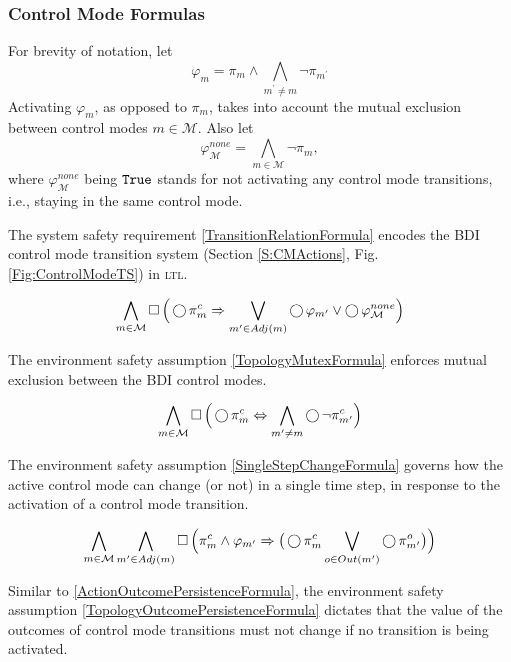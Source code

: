 
\subsubsection{Control Mode Formulas}

For brevity of notation, let $$\varphi_m = \pi_m \wedge \bigwedge_{m^\prime \neq m} \lnot \pi_{m^\prime}$$
Activating $\varphi_m$, as opposed to $\pi_m$, takes into account the mutual exclusion between control modes $m \in \mathcal{M}$.
Also let $$\varphi_\mathcal{M}^{none} = \bigwedge_{m \in \mathcal{M}} \lnot \pi_m,$$
where $\varphi_\mathcal{M}^{none}$ being $\mathtt{True}$ stands for not activating any control mode transitions, i.e., staying in the same control mode.

The system safety requirement \eqref{TransitionRelationFormula} encodes the BDI control mode transition system (Section \ref{S:CMActions}, Fig. \ref{Fig:ControlModeTS}) in \textsc{ltl}.

\begin{equation}\label{TransitionRelationFormula}
	\bigwedge \limits_{m \in \mathcal{M}} \operatorname{\Box} \Big( \operatorname{\bigcirc} \pi_m^c \Rightarrow \bigvee \limits_{m^\prime \in Adj(m)} \operatorname{\bigcirc} \varphi_{m^\prime} \vee \operatorname{\bigcirc} \varphi_\mathcal{M}^{none} \Big)
\end{equation}

The environment safety assumption \eqref{TopologyMutexFormula} enforces mutual exclusion between the BDI control modes.

\begin{equation}\label{TopologyMutexFormula}
	\bigwedge \limits_{m \in \mathcal{M}} \operatorname{\Box} \Big( \operatorname{\bigcirc} \pi_m^c \Leftrightarrow \bigwedge \limits_{m^\prime \neq m} \operatorname{\bigcirc} \lnot \pi_{m^\prime}^c \Big)
\end{equation}

The environment safety assumption \eqref{SingleStepChangeFormula} governs how the active control mode can change (or not) in a single time step, in response to the activation of a control mode transition.

\begin{equation}\label{SingleStepChangeFormula}
	\bigwedge \limits_{m \in \mathcal{M}} \bigwedge \limits_{m^\prime \in Adj(m)} \operatorname{\Box} \Big( \pi_m^c \wedge  \varphi_{m^\prime} \Rightarrow \big( \operatorname{\bigcirc} \pi_{m}^c \bigvee \limits_{o \in Out(m^\prime)} \operatorname{\bigcirc} \pi_{m^\prime}^o \big) \Big)
\end{equation}

Similar to \eqref{ActionOutcomePersistenceFormula}, the environment safety assumption \eqref{TopologyOutcomePersistenceFormula} dictates that the value of the outcomes of control mode transitions must not change if no transition is being activated.

